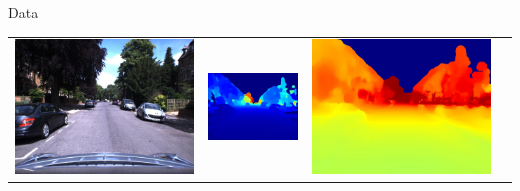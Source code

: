 \begin{frame}{Data}
\begin{tabular}{c c c c}
		\includegraphics[width=\widthcase]{images/dataset/image_000052_stereo_centre.jpg} & 
		\includegraphics[width=\widthcase]{images/dataset/poordepth_000052_stereo_centre.jpg} &
		\includegraphics[width=\widthcase]{images/dataset/depth_000052_stereo_centre.jpg} &

\end{tabular}
\end{frame}
